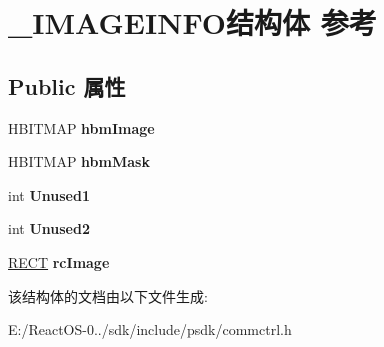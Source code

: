 \hypertarget{struct___i_m_a_g_e_i_n_f_o}{}\section{\+\_\+\+I\+M\+A\+G\+E\+I\+N\+F\+O结构体 参考}
\label{struct___i_m_a_g_e_i_n_f_o}
\subsection*{Public 属性}
\begin{DoxyCompactItemize}
\item 
\mbox{\label{struct___i_m_a_g_e_i_n_f_o_a3ca7ab6fccd4a326e21730069c693ebb}} 
H\+B\+I\+T\+M\+AP {\bfseries hbm\+Image}
\item 
\mbox{\label{struct___i_m_a_g_e_i_n_f_o_a1eb7dc59ef325074bd7ca1d1923a3017}} 
H\+B\+I\+T\+M\+AP {\bfseries hbm\+Mask}
\item 
\mbox{\label{struct___i_m_a_g_e_i_n_f_o_a902a1bfbcd5e6bddcf6715892ea422e7}} 
int {\bfseries Unused1}
\item 
\mbox{\label{struct___i_m_a_g_e_i_n_f_o_a549badf2e813e054b54535fda82f54c5}} 
int {\bfseries Unused2}
\item 
\mbox{\label{struct___i_m_a_g_e_i_n_f_o_a571d7aa71b40260ba78cbdffa52288d1}} 
\hyperlink{structtag_r_e_c_t}{R\+E\+CT} {\bfseries rc\+Image}
\end{DoxyCompactItemize}


该结构体的文档由以下文件生成\+:\begin{DoxyCompactItemize}
\item 
E\+:/\+React\+O\+S-\/0../sdk/include/psdk/commctrl.\+h\end{DoxyCompactItemize}
